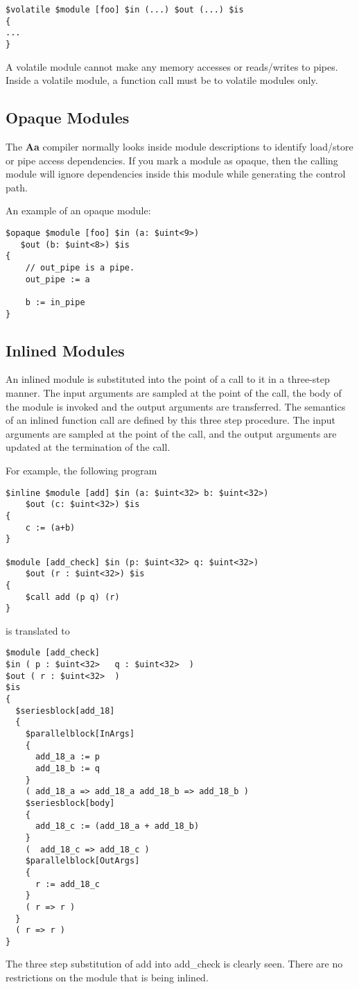 \documentclass{article}
\begin{document}
\begin{verbatim}
$volatile $module [foo] $in (...) $out (...) $is
{
...
}
\end{verbatim}

A volatile module cannot make any memory accesses or 
reads/writes to pipes.  Inside a volatile module, 
a function call must be to volatile modules only.

\subsection{Opaque Modules}

The {\bf Aa} compiler normally looks inside module
descriptions to identify load/store or pipe access
dependencies.  If you mark a module as opaque, then
the calling module will ignore dependencies inside
this module while generating the control path.

An example of an opaque module:
\begin{verbatim}
$opaque $module [foo] $in (a: $uint<9>)
   $out (b: $uint<8>) $is
{
    // out_pipe is a pipe.
    out_pipe := a

    b := in_pipe
}
\end{verbatim}


\subsection{Inlined Modules}

An inlined module is substituted into the
point of a call to it in a three-step manner.
The input arguments are sampled at the point
of the call, the body of
the module is invoked and the output arguments
are transferred.  The semantics of an inlined
function call are defined by this three step
procedure.  The input arguments are sampled
at the point of the call, and the output
arguments are updated at the termination of
the call.

For example, the following
program 
\begin{verbatim}
$inline $module [add] $in (a: $uint<32> b: $uint<32>)
    $out (c: $uint<32>) $is
{
    c := (a+b)
}  

$module [add_check] $in (p: $uint<32> q: $uint<32>) 
    $out (r : $uint<32>) $is
{
    $call add (p q) (r)
}
\end{verbatim}
is translated to
\begin{verbatim}
$module [add_check]
$in ( p : $uint<32>   q : $uint<32>  )
$out ( r : $uint<32>  )
$is
{
  $seriesblock[add_18] 
  {
    $parallelblock[InArgs] 
    {
      add_18_a := p
      add_18_b := q
    }
    ( add_18_a => add_18_a add_18_b => add_18_b )
    $seriesblock[body] 
    {
      add_18_c := (add_18_a + add_18_b)
    }
    (  add_18_c => add_18_c )
    $parallelblock[OutArgs] 
    {
      r := add_18_c
    }
    ( r => r )
  }
  ( r => r )
}
\end{verbatim}
The three step substitution of add into add\_check
is clearly seen.  
There are no restrictions on the
module that is being inlined.
\end{document}
